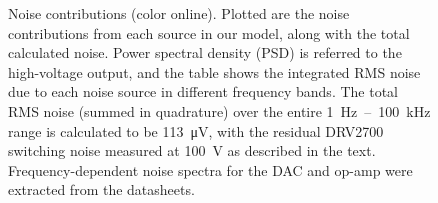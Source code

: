 \documentclass[aip,rsi,reprint]{revtex4-1} %
\begin{document}
\begin{figure}[t]

\caption{Noise contributions (color online). Plotted are the noise contributions from each source in our model, along with the total calculated noise. Power spectral density (PSD) is referred to the high-voltage output, and the table shows the integrated RMS noise due to each noise source in different frequency bands. The total RMS noise (summed in quadrature) over the entire \SI{1}{\hertz}~--~\SI{100}{\kilo\hertz} range is calculated to be \SI{113}{\micro\volt}, with the residual DRV2700 switching noise measured at \SI{100}{\volt} as described in the text. Frequency-dependent noise spectra for the DAC and op-amp were extracted from the datasheets.\label{Fig:NoisePlot}}
\end{figure} 
\end{document}
